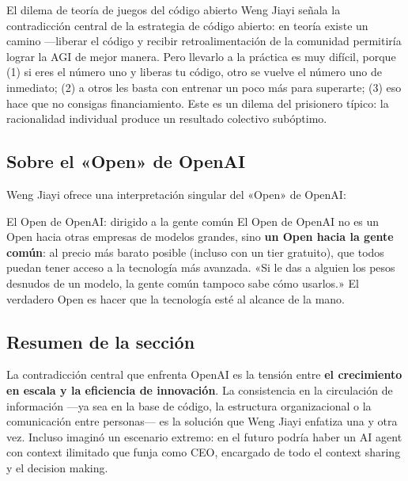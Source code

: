 \begin{knowledgebox}{El dilema de teoría de juegos del código abierto}
Weng Jiayi señala la contradicción central de la estrategia de código abierto: en teoría existe un camino —liberar el código y recibir retroalimentación de la comunidad permitiría lograr la AGI de mejor manera. Pero llevarlo a la práctica es muy difícil, porque (1) si eres el número uno y liberas tu código, otro se vuelve el número uno de inmediato; (2) a otros les basta con entrenar un poco más para superarte; (3) eso hace que no consigas financiamiento. Este es un dilema del prisionero típico: la racionalidad individual produce un resultado colectivo subóptimo.
\end{knowledgebox}

\subsection{Sobre el «Open» de OpenAI}

Weng Jiayi ofrece una interpretación singular del «Open» de OpenAI:

\begin{importantbox}{El Open de OpenAI: dirigido a la gente común}
El Open de OpenAI no es un Open hacia otras empresas de modelos grandes, sino \textbf{un Open hacia la gente común}: al precio más barato posible (incluso con un tier gratuito), que todos puedan tener acceso a la tecnología más avanzada. «Si le das a alguien los pesos desnudos de un modelo, la gente común tampoco sabe cómo usarlos.» El verdadero Open es hacer que la tecnología esté al alcance de la mano.
\end{importantbox}

\subsection{Resumen de la sección}

La contradicción central que enfrenta OpenAI es la tensión entre \textbf{el crecimiento en escala y la eficiencia de innovación}. La consistencia en la circulación de información —ya sea en la base de código, la estructura organizacional o la comunicación entre personas— es la solución que Weng Jiayi enfatiza una y otra vez. Incluso imaginó un escenario extremo: en el futuro podría haber un AI agent con context ilimitado que funja como CEO, encargado de todo el context sharing y el decision making.

